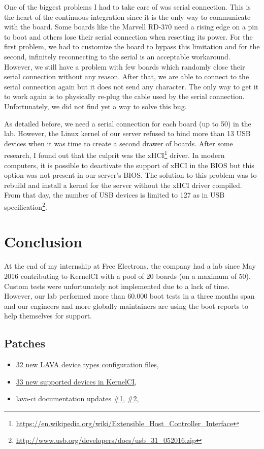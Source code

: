 One of the biggest problems I had to take care of was serial connection. This is the heart of the continuous integration since it is the only way to communicate with the board. Some boards like the Marvell RD-370 need a rising edge on a pin to boot and others lose their serial connection when resetting its power. For the first problem, we had to customize the board to bypass this limitation and for the second, infinitely reconnecting to the serial is an acceptable workaround. However, we still have a problem with few boards which randomly close their serial connection without any reason. After that, we are able to connect to the serial connection again but it does not send any character. The only way to get it to work again is to physically re-plug the cable used by the serial connection. Unfortunately, we did not find yet a way to solve this bug.

As detailed before, we need a serial connection for each board (up to 50) in the lab. However, the Linux kernel of our server refused to bind more than 13 USB devices when it was time to create a second drawer of boards. After some research, I found out that the culprit was the xHCI\footnote{\url{https://en.wikipedia.org/wiki/Extensible\_Host\_Controller\_Interface}} driver. In modern computers, it is possible to deactivate the support of xHCI in the BIOS but this option was not present in our server's BIOS. The solution to this problem was to rebuild and install a kernel for the server without the xHCI driver compiled. From that day, the number of USB devices is limited to 127 as in USB specification\footnote{\url{http://www.usb.org/developers/docs/usb\_31\_052016.zip}}.

\section{Conclusion}
At the end of my internship at Free Electrons, the company had a lab since May 2016 contributing to KernelCI with a pool of 20 boards (on a maximum of 50). Custom tests were unfortunately not implemented due to a lack of time. However, our lab performed more than 60.000 boot tests in a three months span and our engineers and more globally maintainers are using the boot reports to help themselves for support.

\subsection{Patches}

\begin{itemize}
  \item \href{https://review.linaro.org/#/q/Quentin\%20Schulz}{32 new LAVA device types configuration files},
  \item \href{https://github.com/kernelci/lava-ci/commits/master?author=quentin.schulz\%40free-electrons.com&page=1}{33 new supported devices in KernelCI},
  \item lava-ci documentation updates \href{https://github.com/kernelci/lava-ci/commit/058e9a72a752c9851c16a96aa51beafc9ce80128}{\#1}, \href{https://github.com/kernelci/lava-ci/pull/56}{\#2},
\end{itemize}
